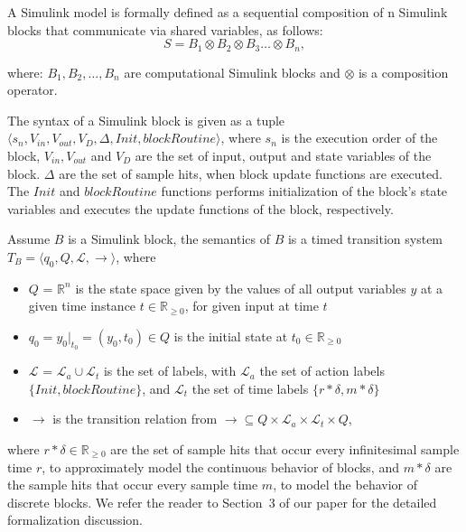 \begin{definition}
	\label{def:Simmodel}
	A Simulink model is formally defined as a sequential composition of n Simulink blocks that communicate via shared variables, as follows:
	\begin{equation}\label{blocksyntax}
	S = B_1 \otimes B_2 \otimes B_3 \dots \otimes B_n,
	\end{equation}
\end{definition}  
where: $ B_1, B_2, \dots, B_n $ are computational Simulink blocks and $\otimes$ is a  composition operator. 

The syntax of a Simulink block is given as a tuple $\langle s_n, V_{in}, V_{out}, V_{D}, \Delta, Init, blockRoutine \rangle$, where $s_n$ is the execution order of the block, $V_{in},V_{out}$ and $V_{D}$ are the set of input, output and state variables of the block. $\Delta$ are the set of sample hits, when block update functions are executed. The $Init$ and $blockRoutine$ functions performs initialization of the block's state variables and executes the update functions of the block, respectively.
\begin{definition} 
	\label{def:semantics-Simblock}
	Assume $B$ is a Simulink block, the semantics of $B$ is a timed transition system
	$T_B = \langle q_0, Q, \mathcal{L}, \longrightarrow \rangle$, where 
	\begin{itemize}
		\item $Q$ = $\mathbb{R}^n$ is the state space given by the values of all output variables $y$ at a given time instance $t \in \mathbb{R}_{\geq 0}$, for given input at time $t$
		\item  $q_0 = y_0|_{t_0} = (y_0, t_0) \in Q$ is the initial state at $t_0\in \mathbb{R}_{\geq 0}$
		\item $\mathcal{L}$ = $\mathcal{L}_a \cup \mathcal{L}_t$ is the set of labels, with $\mathcal{L}_a$ the set of action labels $\{Init, blockRoutine\}$, and  $\mathcal{L}_t$ the set of time labels $\{r* \delta, m*\delta\}$
		\item $\longrightarrow$ is the transition relation from $\longrightarrow \subseteq Q \times \mathcal{L}_a \times \mathcal{L}_t \times Q$,
	\end{itemize}
\end{definition}%
where $r*\delta\in \mathbb{R}_{\geq 0}$ are the set of sample hits that occur every infinitesimal sample time $r$, to approximately model the continuous behavior of blocks, and $m*\delta$ are the sample hits that occur every sample time $m$, to model the behavior of discrete blocks. We refer the reader to Section~3 of our paper \cite{Filipovikj2018SimppaalModels} for the detailed formalization discussion.

